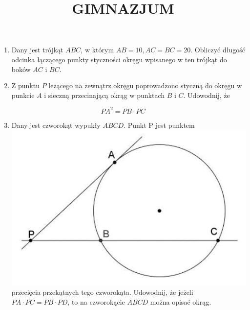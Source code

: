\documentclass[10pt]{article}
\title{GIMNAZJUM }
\author{}
\date{}
\begin{document}
\maketitle
\begin{enumerate}
  \item Dany jest trójkąt \(A B C\), w którym \(A B=10, A C=B C=20\). Obliczyć długość odcinka łączącego punkty styczności okręgu wpisanego w ten trójkąt do boków \(A C\) i \(B C\).
  \item Z punktu \(P\) leżącego na zewnątrz okręgu poprowadzono styczną do okręgu w punkcie \(A\) i sieczną przecinającą okrąg w punktach \(B\) i \(C\). Udowodnij, że
\end{enumerate}

\[
P A^{2}=P B \cdot P C
\]

\begin{enumerate}
  \setcounter{enumi}{2}
  \item Dany jest czworokąt wypukły \(A B C D\). Punkt P jest punktem\\
\includegraphics[max width=\textwidth, center]{2024_11_21_e38482f605918448c267g-1}\\
przecięcia przekątnych tego czworokąta. Udowodnij, że jeżeli \(P A \cdot P C=P B \cdot P D\), to na czworokącie \(A B C D\) można opisać okrąg.
\end{enumerate}
\end{document}
